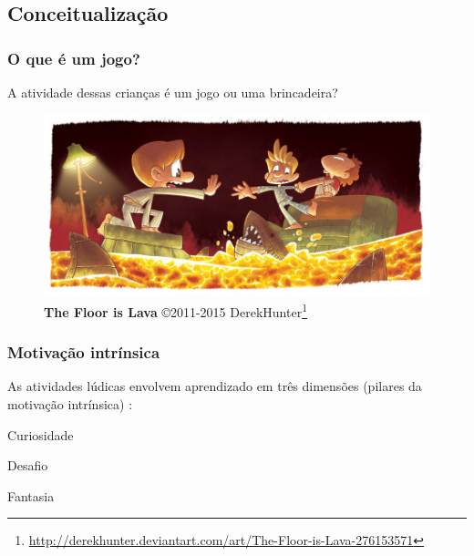 \expandafter\documentclass\expandafter[table, usenames, svgnames, dvipsnames, \classopts]{beamer}
\begin{document}
\subsection{Conceitualização}

\begin{frame}
	\frametitle{\textbf{O que é um jogo?}}

	\begin{center}
		A atividade dessas crianças é um jogo ou uma brincadeira?
	\end{center}	

	\vspace{-2em}
	
	\begin{figure}
		\centering
		\includegraphics[width=0.9\paperwidth]{floor-is-lava}
		\caption{\textbf{The Floor is Lava} \copyright{2011-2015} DerekHunter\footnote{\url{http://derekhunter.deviantart.com/art/The-Floor-is-Lava-276153571}}}
	\end{figure}
	
	\vspace{2em}

\end{frame}

\begin{frame}
	\frametitle{\textbf{Motivação intrínsica}}

	As atividades lúdicas envolvem aprendizado em três dimensões (pilares da motivação intrínsica) \cite{Malone1980}:

	\vspace{1em}

	\begin{outline}
		\1 Curiosidade
			
		\vspace{1em}
		
		\1 Desafio
					
		\vspace{1em}
		
		\1 Fantasia
	\end{outline}
\end{frame}
\end{document}
